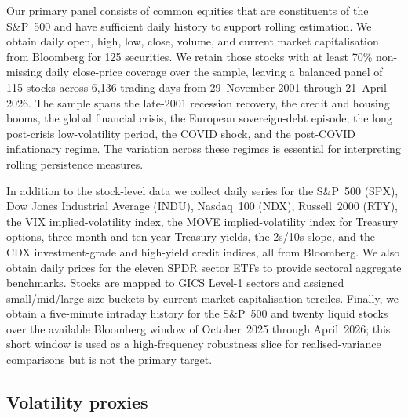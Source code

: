 \documentclass[11pt,a4paper]{article}
\begin{document}
Our primary panel consists of common equities that are constituents of
the S\&P~500 and have sufficient daily history to support rolling
estimation. We obtain daily open, high, low, close, volume, and current
market capitalisation from Bloomberg for 125 securities. We retain those
stocks with at least 70\% non-missing daily close-price coverage over the
sample, leaving a balanced panel of 115 stocks across 6,136 trading days
from 29~November 2001 through 21~April 2026. The sample spans the
late-2001 recession recovery, the credit and housing booms, the global
financial crisis, the European sovereign-debt episode, the long
post-crisis low-volatility period, the COVID shock, and the post-COVID
inflationary regime. The variation across these regimes is essential for
interpreting rolling persistence measures.

In addition to the stock-level data we collect daily series for the
S\&P~500 (SPX), Dow Jones Industrial Average (INDU), Nasdaq~100 (NDX),
Russell~2000 (RTY), the VIX implied-volatility index, the MOVE
implied-volatility index for Treasury options, three-month and ten-year
Treasury yields, the 2s/10s slope, and the CDX investment-grade and
high-yield credit indices, all from Bloomberg. We also obtain daily
prices for the eleven SPDR sector ETFs to provide sectoral aggregate
benchmarks. Stocks are mapped to GICS Level-1 sectors and assigned
small/mid/large size buckets by current-market-capitalisation terciles.
Finally, we obtain a five-minute intraday history for the S\&P~500 and
twenty liquid stocks over the available Bloomberg window of October~2025
through April~2026; this short window is used as a high-frequency
robustness slice for realised-variance comparisons but is not the primary
target.

\subsection{Volatility proxies}
\end{document}
